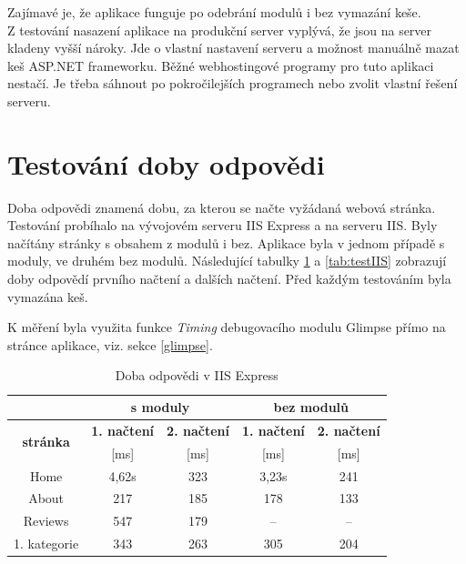 \documentclass[11pt,twoside,a4paper]{book}
\begin{document}
Zajímavé je, že aplikace funguje po odebrání modulů i bez vymazání keše.\\



Z testování nasazení aplikace na produkční server vyplývá, že jsou na server kladeny vyšší nároky. Jde o vlastní nastavení serveru a možnost manuálně mazat keš ASP.NET frameworku. Běžné webhostingové programy pro tuto aplikaci nestačí. Je třeba sáhnout po pokročilejších programech nebo zvolit vlastní řešení serveru.

\section{Testování doby odpovědi}

Doba odpovědi znamená dobu, za kterou se načte vyžádaná webová stránka. Testování probíhalo na vývojovém serveru IIS Express a na serveru IIS. Byly načítány stránky s obsahem z modulů i bez. Aplikace byla v jednom případě s moduly, ve druhém bez modulů. Následující tabulky \ref{tab:testIISE} a \ref{tab:testIIS} zobrazují doby odpovědí prvního načtení a dalších načtení. Před každým testováním byla vymazána keš.

K měření byla využita funkce \textit{Timing} debugovacího modulu \textsf{Glimpse} přímo na stránce aplikace, viz. sekce \ref{glimpse}.


\begin{table}[h!]
\centering
\begin{tabular}[c]{|c||c|c||c|c|}
\hline
 & \multicolumn{2}{c||}{\textbf{s moduly}} & \multicolumn{2}{|c|}{\textbf{bez modulů}} \\
\hline 
\multirow{2}{*}{\textbf{stránka}} & \textbf{1. načtení} & \textbf{2. načtení} & \textbf{1. načtení} & \textbf{2. načtení} \\ 
& [ms] & [ms] & [ms] & [ms] \\
\hline 
Home         & 4,62s  & 323 & 3,23s & 241 \\ 
\hline 
About        & 217  & 185 & 178 & 133 \\ 
\hline 
Reviews      & 547  & 179 & -- & -- \\ 
\hline 
1. kategorie & 343  & 263 & 305 & 204 \\ 
\hline 
\end{tabular}
\caption{Doba odpovědi v IIS Express}
\label{tab:testIISE}
\end{table} 
\end{document}
